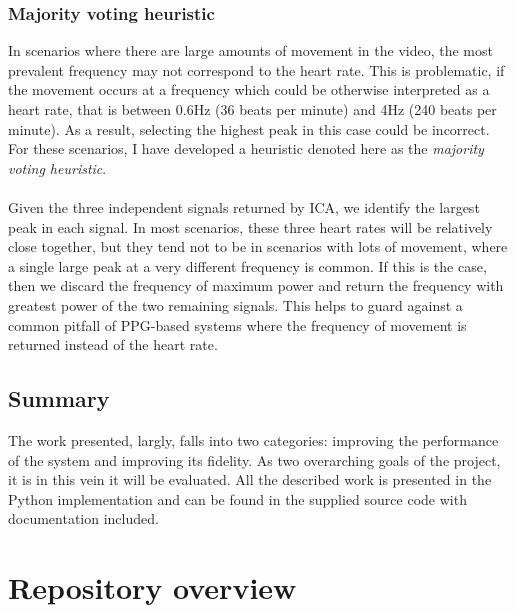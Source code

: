 \subsubsection{Majority voting heuristic}
In scenarios where there are large amounts of movement in the video, the most prevalent frequency may not correspond to the heart rate. This is problematic, if the movement occurs at a frequency 
which could be otherwise interpreted as a heart rate, that is between 0.6Hz (36 beats per minute) and 4Hz (240 beats per minute). As a result, selecting the highest peak in this case could be 
incorrect. For these scenarios, I have developed a heuristic denoted here as the \textit{majority voting heuristic}.
\\\\
Given the three independent signals returned by ICA, we identify the largest peak in each signal. In most scenarios, these three heart rates will be relatively close together, but they tend not to be 
in scenarios with lots of movement, where a single large peak at a very different frequency is common. 
If this is the case, then we discard the frequency of maximum power and return the frequency with greatest power of the two remaining signals.
This helps to guard against a common pitfall of PPG-based systems where the frequency of movement is returned instead of the heart rate\cite{souza2019heart}.

\subsection{Summary}
The work presented, largly, falls into two categories: improving the performance of the system and improving its fidelity. As two overarching goals
of the project, it is in this vein it will be evaluated.
All the described work is presented in the Python implementation and can be found in the supplied source code with documentation included.


\section{Repository overview}
